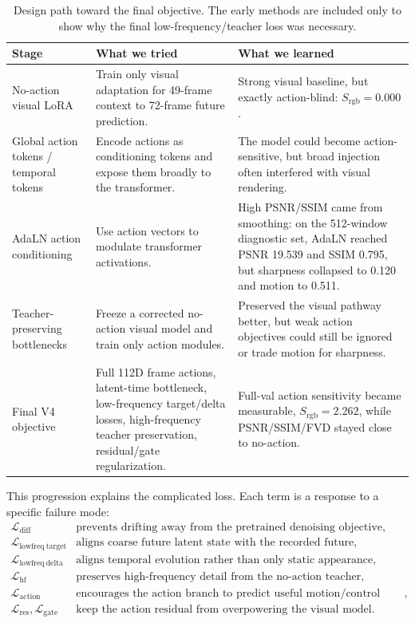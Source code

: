 \documentclass[10pt]{article}
\begin{document}
\begin{table}[H]
\centering
\caption{Design path toward the final objective. The early methods are included only to show why the final low-frequency/teacher loss was necessary.}
\small
\begin{tabularx}{\linewidth}{lX X}
\toprule
\textbf{Stage} & \textbf{What we tried} & \textbf{What we learned} \\
\midrule
No-action visual LoRA & Train only visual adaptation for 49-frame context to 72-frame future prediction. & Strong visual baseline, but exactly action-blind: $S_{\mathrm{rgb}}=0.000$. \\
Global action tokens / temporal tokens & Encode actions as conditioning tokens and expose them broadly to the transformer. & The model could become action-sensitive, but broad injection often interfered with visual rendering. \\
AdaLN action conditioning & Use action vectors to modulate transformer activations. & High PSNR/SSIM came from smoothing: on the 512-window diagnostic set, AdaLN reached PSNR 19.539 and SSIM 0.795, but sharpness collapsed to 0.120 and motion to 0.511. \\
Teacher-preserving bottlenecks & Freeze a corrected no-action visual model and train only action modules. & Preserved the visual pathway better, but weak action objectives could still be ignored or trade motion for sharpness. \\
Final V4 objective & Full 112D frame actions, latent-time bottleneck, low-frequency target/delta losses, high-frequency teacher preservation, residual/gate regularization. & Full-val action sensitivity became measurable, $S_{\mathrm{rgb}}=2.262$, while PSNR/SSIM/FVD stayed close to no-action. \\
\bottomrule
\end{tabularx}
\end{table}

This progression explains the complicated loss. Each term is a response to a specific failure mode:
\[
\begin{array}{ll}
\mathcal{L}_{\mathrm{diff}} & \text{prevents drifting away from the pretrained denoising objective},\\
\mathcal{L}_{\mathrm{lowfreq\ target}} & \text{aligns coarse future latent state with the recorded future},\\
\mathcal{L}_{\mathrm{lowfreq\ delta}} & \text{aligns temporal evolution rather than only static appearance},\\
\mathcal{L}_{\mathrm{hf}} & \text{preserves high-frequency detail from the no-action teacher},\\
\mathcal{L}_{\mathrm{action}} & \text{encourages the action branch to predict useful motion/control summaries},\\
\mathcal{L}_{\mathrm{res}},\mathcal{L}_{\mathrm{gate}} & \text{keep the action residual from overpowering the visual model}.
\end{array}
\]
\end{document}
